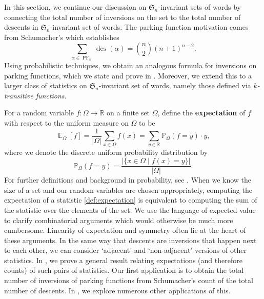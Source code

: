 \documentclass{amsart}
\renewcommand{\P}{\mathbb{P}}
\newcommand{\R}{\mathbb{R}}
\renewcommand{\S}{\mathfrak{S}}
\DeclareMathOperator{\des}{des}
\DeclareMathOperator{\PF}{PF}
\DeclareMathOperator{\E}{\mathbb{E}}
\theoremstyle{definition}
\begin{document}
In this section, we continue our discussion on $\S_n$-invariant sets of words by connecting the total number of inversions on the set to the total number of descents in $\S_n$-invariant set of words. The parking function motivation comes from Schumacher's \cite[Theorem 10]{bib:DescentsInPF} which establishes 
\begin{equation}\label{eq: Schumacker descents}
    \sum_{\alpha\in \PF_n} \des(\alpha)=\binom{n}{2}(n+1)^{n-2}.
\end{equation}
Using probabilistic techniques,
we obtain an analogous formula for inversions on parking functions, which we state and prove in . Moreover, we extend this to a larger class of statistics on $\S_n$-invariant set of words, namely those defined via \textit{$k$-transitive functions}. 
 
For a random variable $f:\Omega \to \R$ on a finite set $\Omega$, define the \textbf{expectation} of $f$ with respect to the uniform measure on $\Omega$ to be \begin{equation}\label{def:expectation}\E_\Omega[f]=\frac{1}{|\Omega|}\sum_{x\in \Omega}f(x)=\sum_{y\in \R} \P_\Omega(f=y) \cdot y,
\end{equation}
where we denote the discrete uniform probability distribution by 
\[\P_\Omega(f=y)=\frac{|\{x\in \Omega\mid f(x)=y\}|}{|\Omega|}.\]
For further definitions and background in probability, see \cite{Durrett_2019,FellerProbability, ProbabilityGut}. When we know the size of a set and our random variables are chosen appropriately, computing the expectation of a statistic \eqref{def:expectation} is equivalent to computing the sum of the statistic over the elements of the set.
We use the language of expected value to clarify combinatorial arguments which would otherwise be much more cumbersome. Linearity of expectation and symmetry often lie at the heart of these arguments. In the same way that descents are inversions that happen next to each other, we can consider `adjacent' and `non-adjacent' versions of other statistics. In , we prove a general result relating expectations (and therefore counts) of such pairs of statistics. Our first application is to obtain the total number of inversions of parking functions from Schumacher's count of the total number of descents. In , we explore numerous other applications of this.
\end{document}
